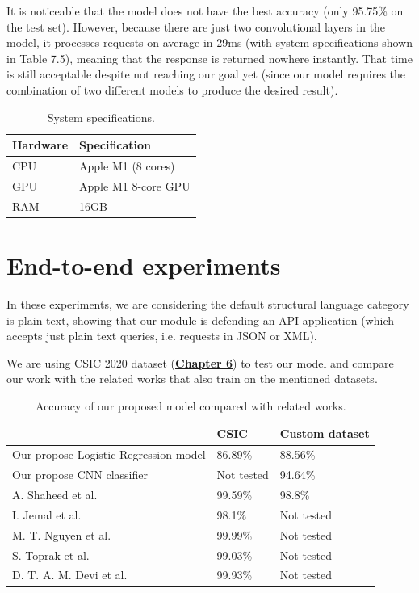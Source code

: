 It is noticeable that the model does not have the best accuracy (only 95.75\% on the test set). However, because there are just two convolutional layers in the model, it processes requests on average in 29ms (with system specifications shown in Table 7.5), meaning that the response is returned nowhere instantly. That time is still acceptable despite not reaching our goal yet (since our model requires the combination of two different models to produce the desired result).

\begin{table}[h!]
\centering
	\begin{tabular}{ll}
	\hline
	\textbf{Hardware} & \textbf{Specification} \\ \hline
	CPU               & Apple M1 (8 cores)     \\
	GPU               & Apple M1 8-core GPU    \\
	RAM               & 16GB                   \\ \hline
	\end{tabular}
	\caption{\label{demo-table} System specifications.}
\end{table}
  
\section{End-to-end experiments}
\hspace{0.5cm}In these experiments, we are considering the default structural language category is plain text, showing that our module is defending an API application (which accepts just plain text queries, i.e. requests in JSON or XML).

We are using CSIC 2020 dataset (\hyperref[subsec:csic_2010]{\textbf{Chapter 6}}) to test our model and compare our work with the related works that also train on the mentioned datasets.

\begin{table}[h!]
\centering
	\begin{tabular}{lll}
	\hline
										  & \textbf{CSIC}       & \textbf{Custom dataset} \\ \hline
	Our propose Logistic Regression model & 86.89\%    & 88.56\%        \\
	Our propose CNN classifier            & Not tested & 94.64\%        \\
	A. Shaheed et al.\cite{Shaheed}                     & 99.59\%    & 98.8\%         \\
	I. Jemal et al. \cite{Jemal}                       & 98.1\%     & Not tested     \\
	M. T. Nguyen et al. \cite{Truong}                      & 99.99\%    & Not tested     \\
	S. Toprak et al. \cite{Toprak}                     & 99.03\%    & Not tested     \\
	D. T. A. M. Devi et al. \cite{Devi}                             & 99.93\%    & Not tested \\ \hline
	\end{tabular}
	\caption{\label{demo-table} Accuracy of our proposed model compared with related works.
	}
\end{table}

